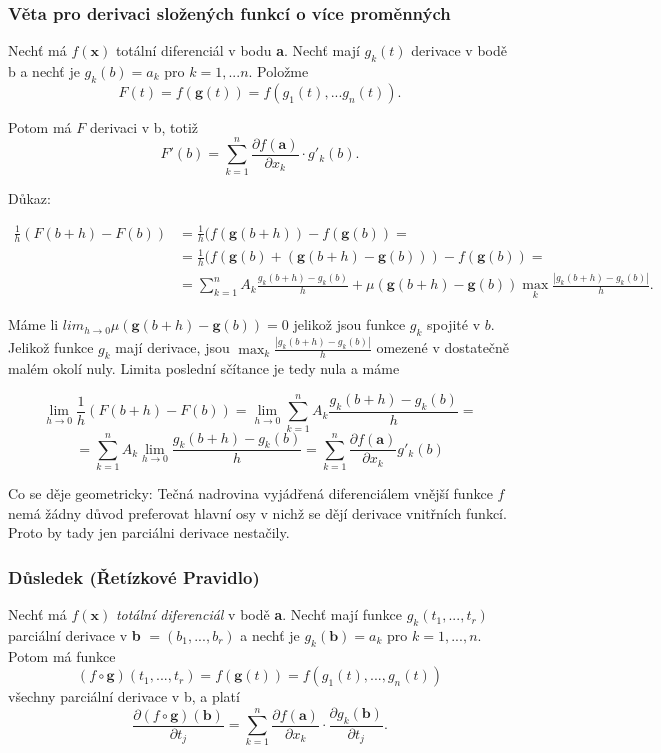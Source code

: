 \documentclass[../main.tex]{subfiles}
\begin{document}
\subsubsection{Věta pro derivaci složených funkcí o více proměnných}
\hspace{1.2mm}
Nechť má $f(\textbf{x})$ totální diferenciál v bodu \textbf{a}. Nechť mají $g_k(t)$ derivace v bodě b a nechť je $g_k(b) = a_k$ pro 
$k = 1,...n.$ Položme
\[F(t) = f(\textbf{g}(t)) = f(g_1(t),...g_n(t)).\]

Potom má $F$ derivaci v b, totiž 
\[F'(b) = \sum^n_{k=1}\frac{\partial f(\textbf{a})}{\partial x_k} \cdot g'_k(b).\]

Důkaz:

\begin{align*} 
 \frac{1}{h} (F(b+h) - F(b)) &= \frac{1}{h}(f(\textbf{g}(b+h)) - f(\textbf{g}(b)) =  \\
 &=\frac{1}{h}(f(\textbf{g}(b) + (\textbf{g}(b+h) - \textbf{g}(b))) - f(\textbf{g}(b)) = \\
 &=\sum^n_{k=1}A_k\frac{g_k(b+h)-g_k(b)}{h} + \mu(\textbf{g}(b+h) - \textbf{g}(b)) \max_k\frac{|g_k(b+h)-g_k(b)|}{h}.
\end{align*}

Máme li $lim_{h \rightarrow 0} \mu(\textbf{g}(b+h)-\textbf{g}(b)) = 0$ jelikož jsou funkce $g_k$ spojité v $b$. 
Jelikož funkce $g_k$ mají derivace, jsou $\max_k \frac{|g_k(b+h) - g_k(b)|}{h}$ omezené v dostatečně malém okolí nuly. Limita 
poslední sčítance je tedy nula a máme

\[\lim_{h \rightarrow 0} \frac{1}{h}(F(b+h) - F(b)) = \lim_{h \rightarrow 0} \sum^n_{k = 1} A_k\frac{g_k(b+h)-g_k(b)}{h} = \]
\[= \sum^n_{k = 1}A_k\lim_{h \rightarrow 0} \frac{g_k(b+h) - g_k(b)}{h} = \sum^n_{k = 1}\frac{\partial f(\textbf{a})}{\partial x_k}g'_k(b)\]

\hspace{1.2mm}
Co se děje geometricky: Tečná nadrovina vyjádřená diferenciálem vnější funkce $f$ nemá žádny důvod preferovat hlavní osy v nichž se 
dějí derivace vnitřních funkcí. Proto by tady jen parciálni derivace nestačily. 
\noindent

\subsubsection{Důsledek (Řetízkové Pravidlo)}
\hspace{1.2mm}
Nechť má $f(\textbf{x})$ \textit{totální diferenciál} v bodě \textbf{a}. Nechť mají funkce $g_k(t_1,...,t_r)$ parciální 
derivace v \textbf{b} $= (b_1,...,b_r)$ a nechť je $g_k(\textbf{b}) = a_k$ pro $k = 1,...,n.$ Potom má funkce
\[(f\circ \textbf{g})(t_1,...,t_r) = f(\textbf{g}(t)) = f(g_1(t),...,g_n(t))\]
všechny parciální derivace v b, a platí 
\[\frac{\partial (f \circ \textbf{g})(\textbf{b})}{\partial t_j} = \sum^n_{k=1}\frac{\partial f(\textbf{a})}{\partial x_k}
\cdot \frac{\partial g_k(\textbf{b})}{\partial t_j}.\]
\end{document}
